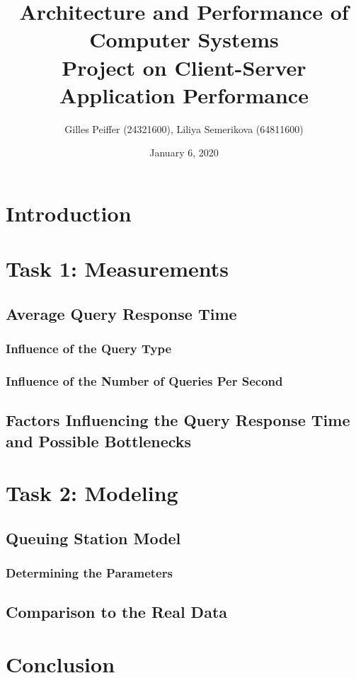 \documentclass[journal]{IEEEtran}
\title{Architecture and Performance of Computer Systems \\ Project on Client-Server Application Performance}
\author{Gilles Peiffer (24321600), Liliya Semerikova (64811600)}
\date{January 6, 2020}
\begin{document}
\maketitle

\begin{abstract}
\end{abstract}

\section*{Introduction}

\section{Task 1: Measurements}
\subsection{Average Query Response Time}
\subsubsection{Influence of the Query Type}
\subsubsection{Influence of the Number of Queries Per Second}
\subsection{Factors Influencing the Query Response Time and Possible Bottlenecks}

\section{Task 2: Modeling}
\subsection{Queuing Station Model}
\subsubsection{Determining the Parameters}
\subsection{Comparison to the Real Data}

\section*{Conclusion}
 
\end{document}
